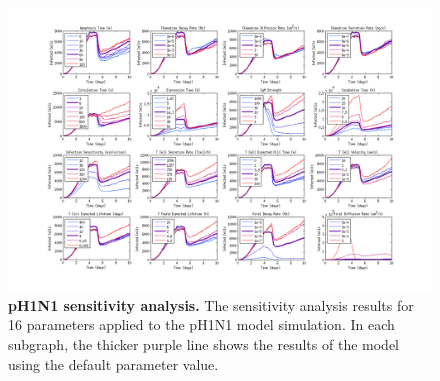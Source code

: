 \documentclass[preprint,10pt,authoryear]{elsarticle}
\newcommand{\drew}[1]{{\color{dkgreen}#1}}
\begin{document}
\begin{landscape}
\begin{figure}[ht!]
\begin{center}
	\includegraphics[width=9in]{Figure_S5}
	\caption{\textbf{pH1N1 sensitivity analysis.} The sensitivity analysis results for 16 parameters applied to the pH1N1 model simulation.  In each subgraph, the thicker purple line shows the results of the model using the default parameter value.}
	\label{fig:psensitivity}
\end{center}
\end{figure}

\end{landscape}




\setcounter{figure}{0}
\renewcommand{\figurename}{Video}
\end{document}
